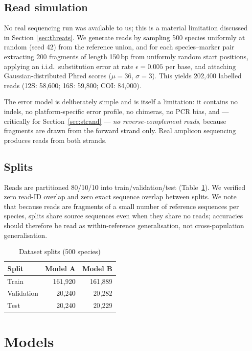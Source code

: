 \documentclass[conference]{IEEEtran}
\begin{document}
\subsection{Read simulation}
No real sequencing run was available to us; this is a material limitation
discussed in Section~\ref{sec:threats}. We generate reads by sampling
500 species uniformly at random (seed 42) from the reference union, and for
each species--marker pair extracting 200 fragments of length 150\,bp from
uniformly random start positions, applying an i.i.d.\ substitution error at
rate $\epsilon = 0.005$ per base, and attaching Gaussian-distributed Phred
scores ($\mu = 36$, $\sigma = 3$). This yields 202{,}400 labelled reads
(12S: 58{,}600; 16S: 59{,}800; COI: 84{,}000).

The error model is deliberately simple and is itself a limitation: it
contains no indels, no platform-specific error profile, no chimeras, no PCR
bias, and --- critically for Section~\ref{sec:strand} --- \emph{no
reverse-complement reads}, because fragments are drawn from the forward
strand only. Real amplicon sequencing produces reads from both strands.

\subsection{Splits}
Reads are partitioned 80/10/10 into train/validation/test
(Table~\ref{tab:splits}). We verified zero read-ID overlap and zero exact
sequence overlap between splits. We note that because reads are fragments
of a small number of reference sequences per species, splits share source
sequences even when they share no reads; accuracies should therefore be read
as within-reference generalisation, not cross-population generalisation.

\begin{table}[t]
\caption{Dataset splits (500 species)}
\label{tab:splits}
\centering
\begin{tabular}{lrr}
\toprule
Split & Model A & Model B \\
\midrule
Train      & 161{,}920 & 161{,}889 \\
Validation & 20{,}240  & 20{,}282 \\
Test       & 20{,}240  & 20{,}229 \\
\bottomrule
\end{tabular}
\end{table}

\section{Models}
\label{sec:models}
\end{document}

